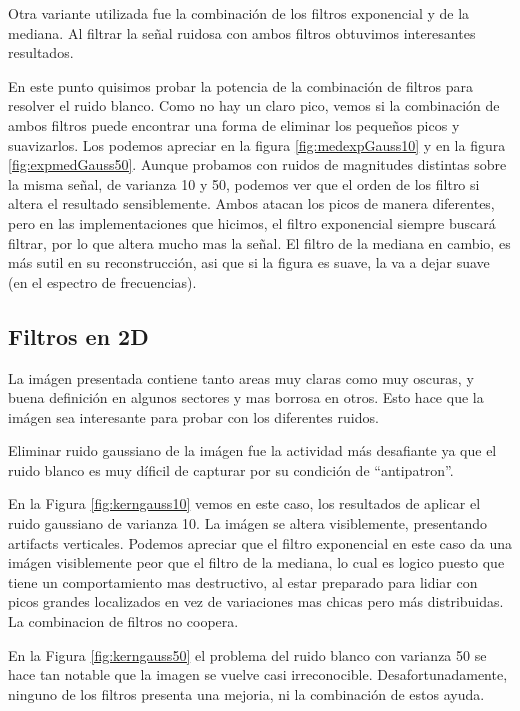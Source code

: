 Otra variante utilizada fue la combinaci\'on de los filtros exponencial y
de la mediana. Al filtrar la se\~nal ruidosa con ambos filtros obtuvimos interesantes
resultados.

En este punto quisimos probar la potencia de la combinaci\'on de filtros para resolver
el ruido blanco. Como no hay un claro pico, vemos si la combinaci\'on de ambos
filtros puede encontrar una forma de eliminar los peque\~nos picos y suavizarlos.
Los podemos apreciar en la figura \ref{fig:medexpGauss10} y en la figura \ref{fig:expmedGauss50}.
Aunque probamos con ruidos de magnitudes distintas sobre la misma se\~nal, de varianza 10 y 50,
podemos ver que el orden de los filtro si altera el resultado sensiblemente. Ambos atacan los 
picos de manera diferentes, pero en las implementaciones que hicimos, el filtro exponencial siempre buscar\'a
filtrar, por lo que altera mucho mas la se\~nal. El filtro de la mediana en cambio, es m\'as sutil
en su reconstrucci\'on, asi que si la figura es suave, la va a dejar suave (en el espectro de frecuencias).


\subsection{Filtros en 2D}

La im\'agen presentada contiene tanto areas muy claras como muy oscuras, y buena definici\'on
en algunos sectores y mas borrosa en otros. Esto hace que la im\'agen sea interesante para probar
con los diferentes ruidos.

Eliminar ruido gaussiano de la im\'agen fue la actividad m\'as desafiante
ya que el ruido blanco es muy d\'ificil de capturar por su condici\'on de ``antipatron''.

En la Figura \ref{fig:kerngauss10} vemos en este caso, los resultados de aplicar el ruido
gaussiano de varianza 10. La im\'agen se altera visiblemente, presentando artifacts verticales.
Podemos apreciar que el filtro exponencial en este caso da una im\'agen visiblemente peor que el
filtro de la mediana, lo cual es logico puesto que tiene un comportamiento mas destructivo,
al estar preparado para lidiar con picos grandes localizados en vez de variaciones mas chicas 
pero m\'as distribuidas. La combinacion de filtros no coopera.

En la Figura \ref{fig:kerngauss50} el problema del ruido blanco con varianza 50 se hace tan 
notable que la imagen se vuelve casi irreconocible. Desafortunadamente, ninguno de 
los filtros presenta una mejoria, ni la combinaci\'on de estos ayuda.

